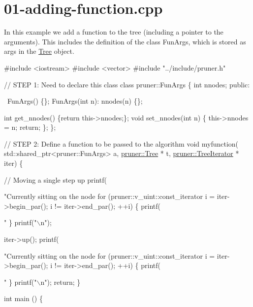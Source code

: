\hypertarget{01-adding-function_8cpp-example}{}\section{01-\/adding-\/function.\+cpp}
In this example we add a function to the tree (including a pointer to the arguments). This includes the definition of the class Fun\+Args, which is stored as args in the \hyperlink{classTree}{Tree} object.


\begin{DoxyCodeInclude}
\textcolor{preprocessor}{#include <iostream>}
\textcolor{preprocessor}{#include <vector>}
\textcolor{preprocessor}{#include "../include/pruner.h"}

\textcolor{comment}{// STEP 1: Need to declare this class}
\textcolor{keyword}{class }pruner::FunArgs \{
  \textcolor{keywordtype}{int} nnodes;
\textcolor{keyword}{public}:
  
  ~FunArgs() \{\};
  FunArgs(\textcolor{keywordtype}{int} n): nnodes(n) \{\};
  
  \textcolor{keywordtype}{int} get\_nnodes() \{\textcolor{keywordflow}{return} this->nnodes;\};
  \textcolor{keywordtype}{void} set\_nnodes(\textcolor{keywordtype}{int} n) \{
    this->nnodes = n;
    \textcolor{keywordflow}{return};
  \};
\};

\textcolor{comment}{// STEP 2: Define a function to be passed to the algorithm}
\textcolor{keywordtype}{void} myfunction(
    std::shared\_ptr<pruner::FunArgs> a,
    \hyperlink{classpruner_1_1Tree}{pruner::Tree} * t,
    \hyperlink{classpruner_1_1TreeIterator}{pruner::TreeIterator} * iter) \{
  
  \textcolor{comment}{// Moving a single step up}
  printf(\textcolor{stringliteral}{"Currently sitting on the node %
  \textcolor{keywordflow}{for} (pruner::v\_uint::const\_iterator i = iter->begin\_par(); i != iter->end\_par(); ++i) \{
    printf(\textcolor{stringliteral}{" %
  \}
  printf(\textcolor{stringliteral}{"\(\backslash\)n"});
  
  iter->up();
  printf(\textcolor{stringliteral}{"Currently sitting on the node %
  \textcolor{keywordflow}{for} (pruner::v\_uint::const\_iterator i = iter->begin\_par(); i != iter->end\_par(); ++i) \{
    printf(\textcolor{stringliteral}{" %
  \}
  printf(\textcolor{stringliteral}{"\(\backslash\)n"});
  \textcolor{keywordflow}{return};
\}

\textcolor{keywordtype}{int} main () \{
  
}}}}
\end{DoxyCodeInclude}

